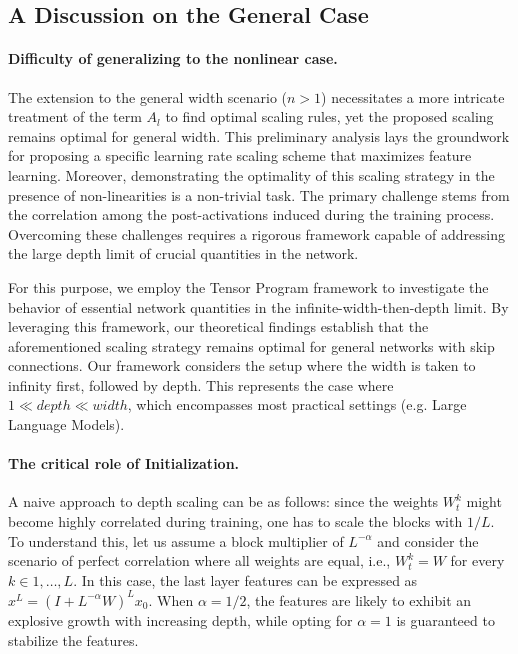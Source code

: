 \subsection{A Discussion on the General Case}
\paragraph{Difficulty of generalizing to the nonlinear case. } The extension to the general width scenario ($n > 1$) necessitates a more intricate treatment of the term $A_l$ to find optimal scaling rules, yet the proposed scaling remains optimal for general width. This preliminary analysis lays the groundwork for proposing a specific learning rate scaling scheme that maximizes feature learning. Moreover, demonstrating the optimality of this scaling strategy in the presence of non-linearities is a non-trivial task. The primary challenge stems from the correlation among the post-activations induced during the training process.  Overcoming these challenges requires a rigorous framework capable of addressing the large depth limit of crucial quantities in the network.

For this purpose, we employ the Tensor Program framework to investigate the behavior of essential network quantities in the infinite-width-then-depth limit. By leveraging this framework, our theoretical findings establish that the aforementioned scaling strategy remains optimal for general networks with skip connections. Our framework considers the setup where the width is taken to infinity first, followed by depth. This represents the case where $1 \ll depth \ll width$, which encompasses most practical settings (e.g. Large Language Models).

\paragraph{The critical role of  Initialization.} A naive approach to depth scaling can be as follows: since the weights $W^k_t$ might become highly correlated during training, one has to scale the blocks with $1/L$. To understand this, let us assume a block multiplier of $L^{-\alpha}$ and consider the scenario of perfect correlation where all weights are equal, i.e., $W^k_t = W$ for every $k \in {1, \dots, L}$. In this case, the last layer features can be expressed as $x^L = \left( I + L^{-\alpha} W\right)^L x_0$. When $\alpha = 1/2$, the features are likely to exhibit an explosive growth with increasing depth, while opting for $\alpha=1$ is guaranteed to stabilize the features.

